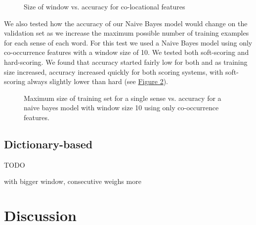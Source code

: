 \documentclass{article}
\begin{document}
\begin{figure}[h]\label{fig:col}
\centering
{}
\caption{Size of window vs. accuracy for co-locational features}
\end{figure}

We also tested how the accuracy of our Naive Bayes model would change on the validation set as we increase the maximum possible number of training examples for each sense of each word. For this test we used a Naive Bayes model using only co-occurrence features with a window size of 10. We tested both soft-scoring and hard-scoring. We found that accuracy started fairly low for both and as training size increased, accuracy increased quickly for both scoring systems, with soft-scoring always slightly lower than hard (see \hyperref[fig:size]{Figure 2}).

\begin{figure}[h]\label{fig:size}
\centering
{}
\caption{Maximum size of training set for a single sense vs. accuracy for a naive bayes model with window size 10 using only co-occurrence features.}
\end{figure}

\subsection{Dictionary-based}

TODO

with bigger window, consecutive weighs more

\section{Discussion}
\end{document}
